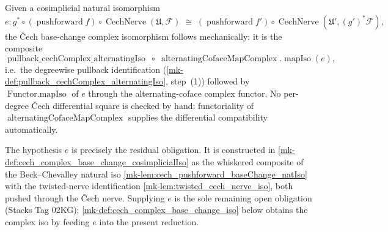 \begin{definition}\label{mk-def:cech_complex_base_change_iso_of_cosimplicialIso}
  \leanok

  Given a cosimplicial natural isomorphism
  \[
    e : g^* \circ (\operatorname{pushforward} f) \circ
        \operatorname{CechNerve}(\mathfrak{U}, \mathcal{F})
      \;\cong\;
      (\operatorname{pushforward} f') \circ
        \operatorname{CechNerve}(\mathfrak{U}', (g')^*\mathcal{F}),
  \]
  the {\v C}ech base-change complex isomorphism follows mechanically: it is the composite
  \[
    \operatorname{pullback\_cechComplex\_alternatingIso}
    \;\circ\;
    \operatorname{alternatingCofaceMapComplex}.\!\operatorname{mapIso}(e),
  \]
  i.e.\ the degreewise pullback identification
  (\ref{mk-def:pullback_cechComplex_alternatingIso}, step~(1)) followed by
  \(\operatorname{Functor.mapIso}\) of \(e\) through the alternating-coface complex
  functor. No per-degree {\v C}ech differential square is checked by hand:
  functoriality of \(\operatorname{alternatingCofaceMapComplex}\) supplies the
  differential compatibility automatically.

  The hypothesis \(e\) is precisely the residual obligation. It is constructed in
  \ref{mk-def:cech_complex_base_change_cosimplicialIso} as the whiskered composite of the
  Beck--Chevalley natural iso \ref{mk-lem:cech_pushforward_baseChange_natIso} with the
  twisted-nerve identification \ref{mk-lem:twisted_cech_nerve_iso}, both pushed through the
  {\v C}ech nerve. Supplying \(e\) is the sole remaining open obligation (Stacks Tag 02KG);
  \ref{mk-def:cech_complex_base_change_iso} below obtains the complex
  iso by feeding \(e\) into the present reduction.
\end{definition}


